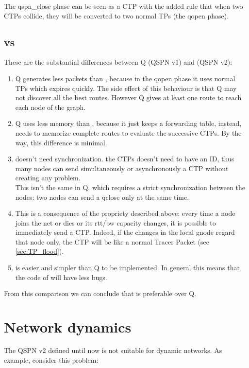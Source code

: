 \documentclass[a4paper]{article}
\begin{document}
The qspn\_close phase can be seen
as a CTP with the added rule that when two CTPs collide, they will be
converted to two normal TPs (the qopen phase).

\subsection{ vs }
These are the substantial differences between Q (QSPN v1) and  (QSPN v2):
\begin{enumerate}
	\item Q generates less packets than , because in the qopen
		phase it uses normal TPs which expires quickly. The side
		effect of this behaviour is that Q may not discover all
		the best routes. However Q gives at least one route to
		reach each node of the graph.

	\item Q uses less memory than , because it just keeps a
		forwarding table, instead,  needs to memorize 
		 complete routes to evaluate the successive
		CTPs. By the way, this difference is minimal.

	\item  doesn't need synchronization. the CTPs doesn't need to
		have an ID, thus many nodes can send simultaneously or
		asynchronously a CTP without creating any problem.\\
		This isn't the same in Q, which requires a strict
		synchronization between the nodes: two nodes can send 
		a qclose only at the same time.
	
	\item This is a consequence of the propriety described above: every
		time a node joins the net or dies or its rtt/bw capacity
		changes, it is possible to immediately send a CTP. Indeed, if
		the changes in the local gnode regard that node only, the CTP
		will be like a normal Tracer Packet (see \ref{sec:TP_flood}).

	\item  is easier and simpler than Q to be implemented. In
		general this means that the code of  will have less
		bugs.
\end{enumerate}

From this comparison we can conclude that  is preferable over Q.

\section{Network dynamics}
\label{sec:netdyn}
The QSPN v2 defined until now is not suitable for dynamic networks. As
example, consider this problem:
\end{document}
